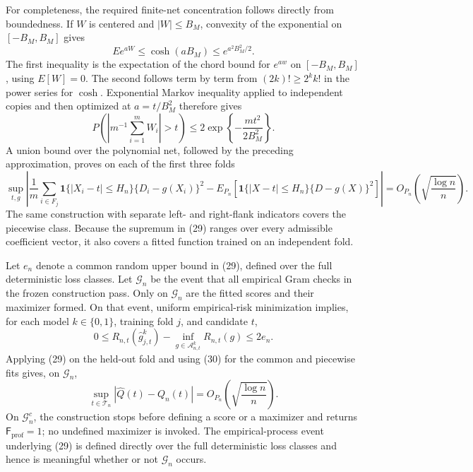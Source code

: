 For completeness, the required finite-net concentration follows
directly from boundedness.  If \(W\) is centered and
\(|W|\le B_M\), convexity of the exponential on
\([-B_M,B_M]\) gives
\[
 E e^{aW}\le\cosh(aB_M)\le e^{a^2B_M^2/2}.
 \tag{27}
\]
The first inequality is the expectation of the chord bound for
\(e^{aw}\) on \([-B_M,B_M]\), using \(E[W]=0\).  The second follows
term by term from
\((2k)!\ge2^k k!\) in the power series for \(\cosh\).
Exponential Markov inequality applied to independent copies and then
optimized at \(a=t/B_M^2\) therefore gives
\[
 P\left(\left|m^{-1}\sum_{i=1}^mW_i\right|>t\right)
 \le2\exp\left\{-\frac{mt^2}{2B_M^2}\right\}.
 \tag{28}
\]
A union bound over the polynomial net, followed by the preceding
approximation, proves on each of the first three folds
\[
 \sup_{t,g}\left|
  \frac1m\sum_{i\in F_j}\mathbf 1\{|X_i-t|\le H_n\}
       \{D_i-g(X_i)\}^2
  -E_{P_n}\!\left[\mathbf 1\{|X-t|\le H_n\}
       \{D-g(X)\}^2\right]
 \right|
 =O_{P_n}\!\left(\sqrt{\frac{\log n}{n}}\right).
 \tag{29}
\]
The same construction with separate left- and right-flank indicators
covers the piecewise class.  Because the supremum in (29) ranges over
every admissible coefficient vector, it also covers a fitted function
trained on an independent fold.

Let \(e_n\) denote a common random upper bound in (29), defined over
the full deterministic loss classes.  Let \(\mathcal G_n\) be the
event that all empirical Gram checks in the frozen construction pass.
Only on \(\mathcal G_n\) are the fitted scores and their maximizer
formed.  On that event, uniform empirical-risk minimization implies,
for each model \(k\in\{0,1\}\), training fold \(j\), and candidate
\(t\),
\[
 0\le R_{n,t}(\widehat g_{j,t}^{k})
       -\inf_{g\in\mathcal A_{n,t}^k}R_{n,t}(g)\le2e_n.
 \tag{30}
\]
Applying (29) on the held-out fold and using (30) for the common and
piecewise fits gives, on \(\mathcal G_n\),
\[
 \sup_{t\in\mathcal T_n}|\widehat Q(t)-Q_n(t)|
 =O_{P_n}\!\left(\sqrt{\frac{\log n}{n}}\right).
 \tag{31}
\]
On \(\mathcal G_n^c\), the construction stops
before defining a score or a maximizer and returns
\(\mathsf F_{\mathrm{prof}}=1\); no undefined maximizer is invoked.
The empirical-process event underlying (29) is defined directly over
the full deterministic loss classes and hence is meaningful whether
or not \(\mathcal G_n\) occurs.

